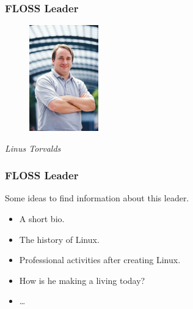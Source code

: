 \documentclass{beamer}
\begin{document}
\begin{frame}
\frametitle{FLOSS Leader}

\begin{figure}[h]
\begin{center}
  \includegraphics[height=1.80in]{figs/linus_torvalds.jpg}
\end{center}
\end{figure}

\pause

\begin{center}
{\it Linus Torvalds}
\end{center}

\end{frame}

\begin{frame}
\frametitle{FLOSS Leader}

Some ideas to find information about this leader.
\pause
\begin{itemize}
\item A short bio.
\item The history of Linux.
\item Professional activities after creating Linux.
\item How is he making a living today?
\item \ldots
\end{itemize}

\end{frame}
\end{document}
